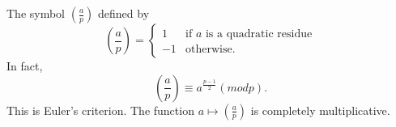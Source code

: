 The symbol  $  \left ( \frac{a}{p} \right )  $  defined by
 \[ \left ( \frac{a}{p} \right )=  
 \left \{ 
 \begin{array}{cc} 
   1  & \mbox{if $a$ is a quadratic residue} \\
   -1 & \mbox{otherwise}. 
 \end{array} 
 \right .  
 \]
In fact, \[ \left ( \frac{a}{p} \right ) \equiv a^{ \frac{p-1}{2}}
(mod p). \] This is Euler's criterion.  The function $ a \mapsto \left
( \frac{a}{p} \right ) $ is completely multiplicative.